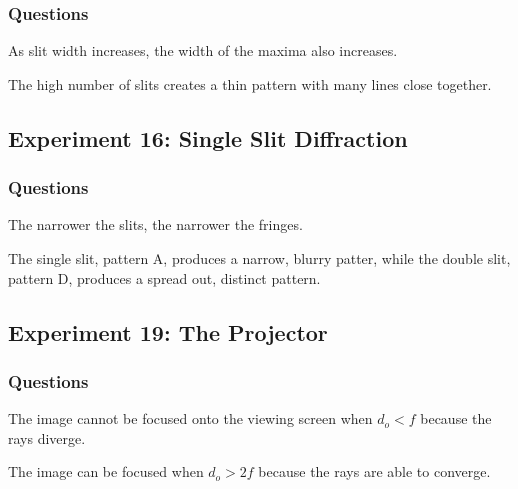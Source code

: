\documentclass[12pt]{article}
\begin{document}
\subsubsection{Questions}

\subsubsubsection{}

As slit width increases, the width of the maxima also increases.

\subsubsubsection{}

The high number of slits creates a thin pattern with many lines close together.



\subsection{Experiment 16: Single Slit Diffraction}

\subsubsection{Questions}

\subsubsubsection{}

The narrower the slits, the narrower the fringes.

\subsubsubsection{}

The single slit, pattern A, produces a narrow, blurry patter, while the
double slit, pattern D, produces a spread out, distinct pattern.



\subsection{Experiment 19: The Projector}

\subsubsection{Questions}

\subsubsubsection{}

The image cannot be focused onto the viewing screen when \(d_o < f\) because the
rays diverge.

\subsubsubsection{}

The image can be focused when \(d_o > 2f\) because the rays are able to
converge.
\end{document}

